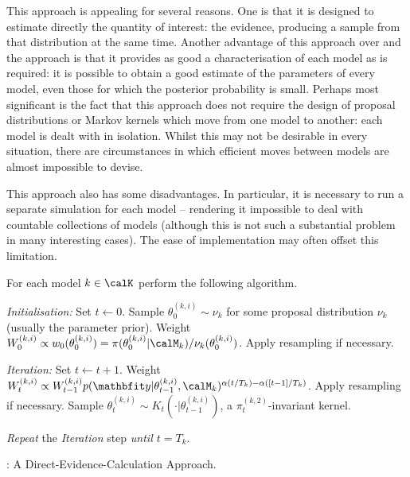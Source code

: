 
This approach is appealing for several reasons. One is that it is designed to
estimate directly the quantity of interest: the evidence, producing a sample
from that distribution at the same time. Another advantage of this approach
over \smc[1] and the \rjmcmc approach is that it provides as good a
characterisation of each model as is required: it is possible to obtain a good
estimate of the parameters of every model, even those for which the posterior
probability is small. Perhaps most significant is the fact that this approach
does not require the design of proposal distributions or Markov kernels which
move from one model to another: each model is dealt with in isolation. Whilst
this may not be desirable in every situation, there are circumstances in which
efficient moves between models are almost impossible to devise.

This approach also has some disadvantages. In particular, it is necessary to
run a separate simulation for each model -- rendering it impossible to deal
with countable collections of models (although this is not such a substantial
problem in many interesting cases). The ease of implementation may often
offset this limitation.

\begin{algorithm}
\begin{algorithmic}
  \tophrule
  \STATE For each model $k \in \calK$ perform the following algorithm.

  \STATE \emph{Initialisation:} Set $t\leftarrow0$.
  \STATE\STATESKIP Sample $\theta_0^{(k,i)}\sim\nu_k$ for some proposal
  distribution $\nu_k$ (usually the parameter prior).
  \STATE\STATESKIP Weight $W_0^{(k,i)} \propto w_0(\theta_0^{(k,i)}) =
  {\pi(\theta_0^{(k,i)}|\Mk)}/{\nu_k(\theta_0^{(k,i)})}$.
  \STATE\STATESKIP Apply resampling if necessary.

  \STATE \emph{Iteration:} Set $t\leftarrow t + 1$.
  \STATE\STATESKIP Weight $W_t^{(k,i)} \propto W_{t-1}^{(k,i)}
  p(\data|\theta_{t-1}^{(k,i)},\Mk)^{\alpha(t/T_k) - \alpha([t-1]/T_k)}$.
  \STATE\STATESKIP Apply resampling if necessary.
  \STATE\STATESKIP Sample $\theta_t^{(k,i)} \sim
  K_t(\cdot|\theta_{t-1}^{(k,i)})$, a $\pi_t^{(k,2)}$-invariant kernel.

  \STATE \emph{Repeat} the \emph{Iteration} step \emph{until $t = T_k$}.
  \bottomhrule
\end{algorithmic}
\caption{\smc[2]: A Direct-Evidence-Calculation Approach.}\label{alg:smc2}
\end{algorithm}

